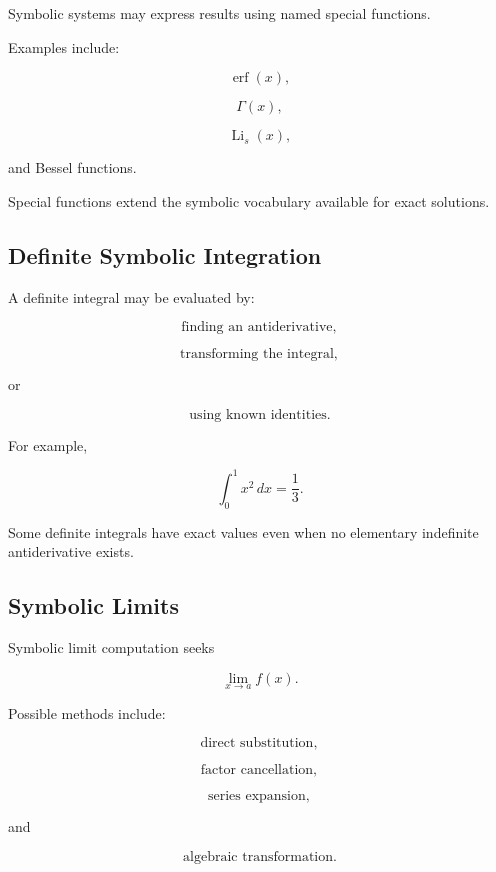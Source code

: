 Symbolic systems may express results using named special functions.

Examples include:

\[
\boxed{
\operatorname{erf}(x),
}
\]

\[
\boxed{
\Gamma(x),
}
\]

\[
\boxed{
\operatorname{Li}_s(x),
}
\]

and Bessel functions.

Special functions extend the symbolic vocabulary available for exact
solutions.

\subsection{Definite Symbolic Integration}
\label{subsec:definite-symbolic-integration}

A definite integral may be evaluated by:

\[
\boxed{
\text{finding an antiderivative},
}
\]

\[
\boxed{
\text{transforming the integral},
}
\]

or

\[
\boxed{
\text{using known identities}.
}
\]

For example,

\[
\boxed{
\int_0^1x^2\,dx
=
\frac13.
}
\]

Some definite integrals have exact values even when no elementary
indefinite antiderivative exists.

\subsection{Symbolic Limits}
\label{subsec:symbolic-limits}

Symbolic limit computation seeks

\[
\boxed{
\lim_{x\to a}f(x).
}
\]

Possible methods include:

\[
\boxed{
\text{direct substitution},
}
\]

\[
\boxed{
\text{factor cancellation},
}
\]

\[
\boxed{
\text{series expansion},
}
\]

and

\[
\boxed{
\text{algebraic transformation}.
}
\]

